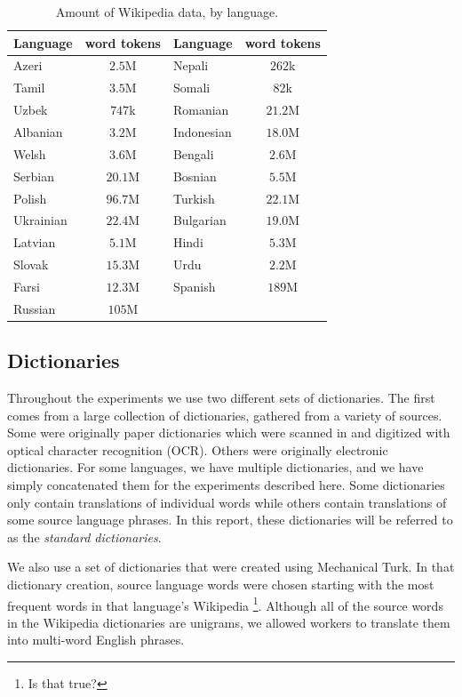 \documentclass[11pt]{article}
\begin{document}
\begin{table}\footnotesize
\begin{center}
\begin{tabular}{|l|c|l|c|}
\hline
Language & word tokens & Language & word tokens \\
\hline
Azeri & $2.5$M & Nepali & $262$k \\
Tamil & $3.5$M & Somali & $82$k \\
Uzbek & $747$k & Romanian & $21.2$M \\
Albanian & $3.2$M & Indonesian & $18.0$M \\
Welsh & $3.6$M & Bengali & $2.6$M \\
Serbian & $20.1$M & Bosnian & $5.5$M \\
Polish & $96.7$M & Turkish & $22.1$M \\
Ukrainian & $22.4$M & Bulgarian & $19.0$M\\
Latvian & $5.1$M & Hindi & $5.3$M\\
Slovak & $15.3$M & Urdu & $2.2$M\\
Farsi & $12.3$M & Spanish & $189$M\\
Russian & $105$M & &\\
\hline
\end{tabular}
\end{center}
\caption{\label{table:wiki}Amount of Wikipedia data, by language.}
\end{table}

\subsection {Dictionaries}\label{ssec:dicts}

Throughout the experiments we use two different sets of dictionaries. The first comes from a large collection of dictionaries, gathered from a variety of sources. Some were originally paper dictionaries which were scanned in and digitized with optical character recognition (OCR). Others were originally electronic dictionaries. For some languages, we have multiple dictionaries, and we have simply concatenated them for the experiments described here. Some dictionaries only contain translations of individual words while others contain translations of some source language phrases. In this report, these dictionaries will be referred to as the {\it standard dictionaries}. 

We also use a set of dictionaries that were created using Mechanical Turk. In that dictionary creation, source language words were chosen starting with the most frequent words in that language's Wikipedia \footnote{Is that true?}. Although all of the source words in the Wikipedia dictionaries are unigrams, we allowed workers to translate them into multi-word English phrases. 
\end{document}
